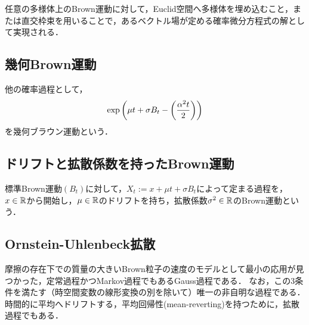 \documentclass[uplatex,dvipdfmx]{jsreport}
\begin{document}
\begin{proposition}
    任意の多様体上のBrown運動に対して，Euclid空間へ多様体を埋め込むこと，または直交枠束を用いることで，あるベクトル場が定める確率微分方程式の解として実現される．
\end{proposition}

\subsection{幾何Brown運動}

\begin{example}
    他の確率過程として，
    \[\exp\left(\mu t+\sigma B_t-\left(\frac{\alpha^2t}{2}\right)\right)\]
    を幾何ブラウン運動という．
\end{example}

\subsection{ドリフトと拡散係数を持ったBrown運動}

\begin{example}
    標準Brown運動$(B_t)$に対して，$X_t:=x+\mu t+\sigma B_t$によって定まる過程を，$x\in\mathbb{R}$から開始し，$\mu\in\mathbb{R}$のドリフトを持ち，拡散係数$\sigma^2\in\mathbb{R}$のBrown運動という．
\end{example}

\subsection{Ornstein-Uhlenbeck拡散}

\begin{tcolorbox}[colframe=ForestGreen, colback=ForestGreen!10!white,breakable,colbacktitle=ForestGreen!40!white,coltitle=black,fonttitle=\bfseries\sffamily,
title=]
    摩擦の存在下での質量の大きいBrown粒子の速度のモデルとして最小の応用が見つかった，定常過程かつMarkov過程でもあるGauss過程である．
    なお，この3条件を満たす（時空間変数の線形変換の別を除いて）唯一の非自明な過程である．
    時間的に平均へドリフトする，平均回帰性(mean-reverting)を持つために，拡散過程でもある．
\end{tcolorbox}
\end{document}
